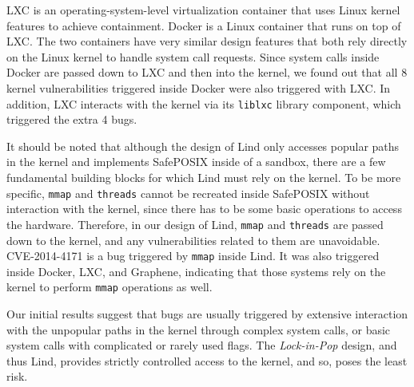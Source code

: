 {{{LXC \cite{LXC} is an operating-system-level virtualization container that uses Linux kernel features to achieve containment.
Docker \cite{Docker} is a Linux container that runs on top of LXC. The two containers have very similar design features
that both rely directly on the Linux kernel to handle system call requests. Since system calls inside Docker are passed down
to LXC and then into the kernel, we found out that all 8 kernel vulnerabilities triggered inside Docker were also triggered
with LXC. In addition, LXC interacts with the kernel via its \texttt{liblxc} library component, which triggered the extra 4 bugs.

It should be noted that although the design of Lind only accesses popular paths in the kernel and implements SafePOSIX inside
of a sandbox, there are a few fundamental building blocks for which Lind must rely on the kernel. To be more specific,
\texttt{mmap} and \texttt{threads} cannot be recreated inside SafePOSIX without interaction with the kernel, since there has
to be some basic operations to access the hardware. Therefore, in our design of Lind, \texttt{mmap} and \texttt{threads}
are passed down to the kernel, and any vulnerabilities related to them are  unavoidable.
CVE-2014-4171 is a bug triggered by \texttt{mmap} inside Lind. It was also triggered inside Docker, LXC, and Graphene, indicating
that those systems rely on the kernel to perform \texttt{mmap} operations as well.

Our initial results suggest that bugs are usually triggered by extensive interaction with the unpopular paths in the kernel through
complex system calls, or basic system calls
with complicated or rarely used flags. The \emph{Lock-in-Pop} design, and thus Lind,
provides strictly controlled access to the kernel, and so, poses
the least risk.



}}}
